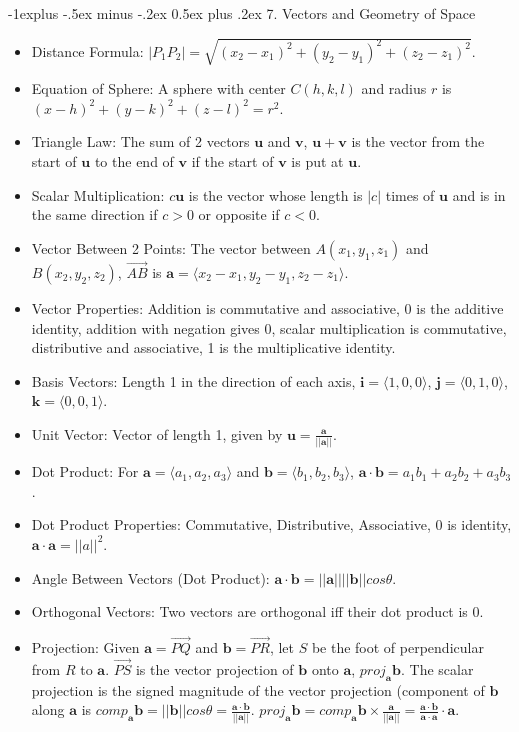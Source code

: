 \documentclass[10pt, portrait]{article}
\makeatletter
\renewcommand{\section}{\@startsection{section}{1}{0mm}%
                                {-1ex plus -.5ex minus -.2ex}%
                                {0.5ex plus .2ex}%
                                {\normalfont\large\bfseries}}
\renewcommand{\section}{\@startsection{section}{2}{0mm}%
                                {-1explus -.5ex minus -.2ex}%
                                {0.5ex plus .2ex}%
                                {\normalfont\normalsize\bfseries}}
\makeatother
\begin{document}
\begin{multicols*}{2}
\section{7. Vectors and Geometry of Space}
\begin{itemize}
    \item Distance Formula: $|P_1P_2|=\sqrt{(x_2-x_1)^2+(y_2-y_1)^2+(z_2-z_1)^2}$.
    \item Equation of Sphere: A sphere with center $C(h, k, l)$ and radius $r$ is $(x-h)^2+(y-k)^2+(z-l)^2=r^2$.
    \item Triangle Law: The sum of 2 vectors $\bm{u}$ and $\bm{v}$, $\bm{u+v}$ is the vector from the start of $\bm{u}$ to the end of $\bm{v}$ if the start of $\bm{v}$ is put at $\bm{u}$.
    \item Scalar Multiplication: $c\bm{u}$ is the vector whose length is $|c|$ times of $\bm{u}$ and is in the same direction if $c>0$ or opposite if $c<0$.
    \item Vector Between 2 Points: The vector between $A(x_1,y_1,z_1)$ and $B(x_2,y_2,z_2)$, $\vec{AB}$ is $\bm{a}=\langle x_2-x_1, y_2-y_1, z_2-z_1 \rangle$.
    \item Vector Properties: Addition is commutative and associative, 0 is the additive identity, addition with negation gives 0, scalar multiplication is commutative, distributive and associative, 1 is the multiplicative identity.
    \item Basis Vectors: Length 1 in the direction of each axis, $\bm{i}=\langle1, 0, 0\rangle$, $\bm{j}=\langle0, 1, 0\rangle$, $\bm{k}=\langle0, 0, 1\rangle$.
    \item Unit Vector: Vector of length 1, given by $\bm{u}=\frac{\bm{a}}{||\bm{a}||}$.
    \item Dot Product: For $\bm{a}=\langle a_1,a_2,a_3\rangle$ and $\bm{b}=\langle b_1,b_2,b_3\rangle$, $\bm{a}\cdot\bm{b}=a_1b_1+a_2b_2+a_3b_3$.
    \item Dot Product Properties: Commutative, Distributive, Associative, 0 is identity, $\bm{a}\cdot\bm{a}=||a||^2$.
    \item Angle Between Vectors (Dot Product): $\bm{a}\cdot\bm{b}=||\bm{a}||||\bm{b}||cos\theta$.
    \item Orthogonal Vectors: Two vectors are orthogonal iff their dot product is 0.
    \item Projection: Given $\bm{a}=\vec{PQ}$ and $\bm{b}=\vec{PR}$, let $S$ be the foot of perpendicular from $R$ to $\bm{a}$. $\vec{PS}$ is the vector projection of $\bm{b}$ onto $\bm{a}$, $proj_{\bm{a}}\bm{b}$. The scalar projection is the signed magnitude of the vector projection (component of $\bm{b}$ along $\bm{a}$ is $comp_{\bm{a}}\bm{b} = ||\bm{b}||cos\theta=\frac{\bm{a}\cdot\bm{b}}{||\bm{a}||}$. $proj_{\bm{a}}\bm{b}=comp_{\bm{a}}\bm{b}\times\frac{\bm{a}}{||\bm{a}||}=\frac{\bm{a}\cdot\bm{b}}{\bm{a}\cdot\bm{a}}\cdot\bm{a}$.

\end{itemize}
\end{multicols*}
\end{document}
